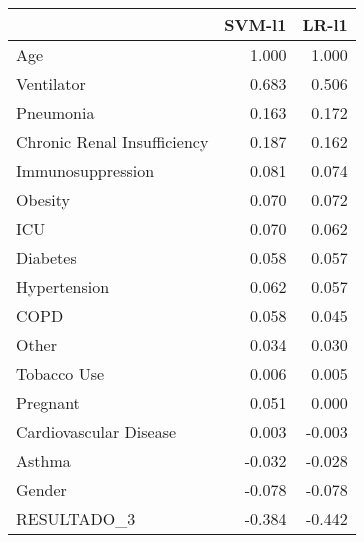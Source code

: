 \begin{tabular}{lrr}
\toprule
{} &  SVM-l1 &  LR-l1 \\
\midrule
Age                         &   1.000 &  1.000 \\
Ventilator                  &   0.683 &  0.506 \\
Pneumonia                   &   0.163 &  0.172 \\
Chronic Renal Insufficiency &   0.187 &  0.162 \\
Immunosuppression           &   0.081 &  0.074 \\
Obesity                     &   0.070 &  0.072 \\
ICU                         &   0.070 &  0.062 \\
Diabetes                    &   0.058 &  0.057 \\
Hypertension                &   0.062 &  0.057 \\
COPD                        &   0.058 &  0.045 \\
Other                       &   0.034 &  0.030 \\
Tobacco Use                 &   0.006 &  0.005 \\
Pregnant                    &   0.051 &  0.000 \\
Cardiovascular Disease      &   0.003 & -0.003 \\
Asthma                      &  -0.032 & -0.028 \\
Gender                      &  -0.078 & -0.078 \\
RESULTADO\_3                 &  -0.384 & -0.442 \\
\bottomrule
\end{tabular}
